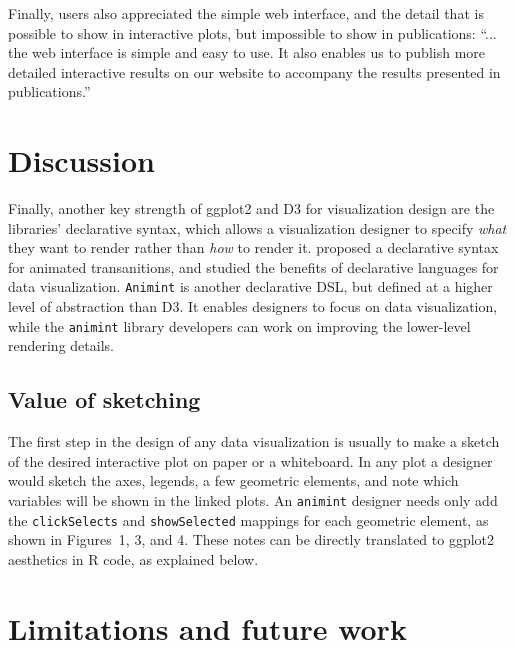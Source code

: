 \documentclass[journal]{vgtc}\usepackage[]{graphicx}\usepackage[]{color}
\begin{document}
Finally, users also appreciated the simple web interface, and the
detail that is possible to show in interactive plots, but impossible
to show in publications: ``...  the web interface is simple and easy
to use.  It also enables us to publish more detailed interactive
results on our website to accompany the results presented in
publications.''

\section{Discussion}

Finally, another key strength of ggplot2 and D3 for visualization
design are the libraries' declarative syntax, which allows a
visualization designer to specify \emph{what} they want to render
rather than \emph{how} to render it. \citet{declarative} proposed a
declarative syntax for animated transanitions, and studied the
benefits of declarative languages for data visualization. \texttt{Animint} is
another declarative DSL, but defined at a higher level of abstraction
than D3. It enables designers to focus on data visualization, while
the \texttt{animint} library developers can work on improving the lower-level
rendering details.

\subsection{Value of sketching}

The first step in the design of any data visualization is usually to
make a sketch of the desired interactive plot on paper or a
whiteboard.  In any plot a designer would sketch the axes, legends, a
few geometric elements, and note which variables will be shown in the
linked plots. An \texttt{animint} designer needs only add the
\texttt{clickSelects} and \texttt{showSelected} mappings for
each geometric element, as shown in Figures~1, 3, and 4. These notes
can be directly translated to ggplot2 aesthetics in R code, as
explained below.


\section{Limitations and future work}

\end{document}
